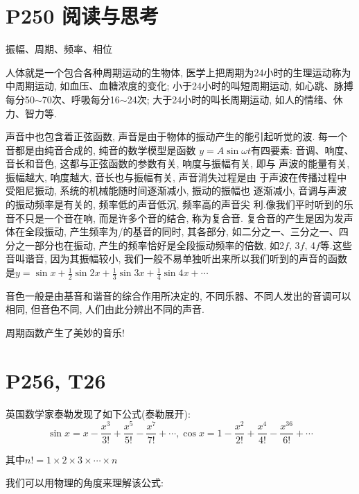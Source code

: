 \documentclass{book}
\begin{document}
    \section{\textcolor[rgb]{0.11,0.65,0.52}{P250 阅读与思考}}
    
    \begin{center}
        振幅、周期、频率、相位
    \end{center}

    人体就是一个包合各种周期运动的生物体, 医学上把周期为24小时的生理运动称为中周期运动, 如血压、血糖浓度的变化; 小于24小时的叫短周期运动,  如心跳、脉搏每分50$\sim$70次、呼吸每分16$\sim$24次; 大于24小时的叫长周期运动, 如人的情绪、休力、智力等. 
    
    声音中也包含着正弦函数, 声音是由于物体的振动产生的能引起听觉的波. 每一个音都是由纯音合成的, 纯音的数学模型是函数 $y=A\sin \omega t$有四要素:  音调、响度、音长和音色, 这都与正弦函数的参数有关, 响度与振幅有关, 即与 声波的能量有关, 振幅越大, 响度越大, 音长也与振幅有关, 声音消失过程是由 于声波在传播过程中受阻尼振动, 系统的机械能随时间逐渐减小, 振动的振幅也 逐渐减小, 音调与声波的振动频率是有关的, 频率低的声音低沉, 频率高的声音尖
    利.像我们平时听到的乐音不只是一个音在响, 而是许多个音的结合, 称为复合音.  复合音的产生是因为发声体在全段振动, 产生频率为/的基音的同时, 其各部分,  如二分之一、三分之一、四分之一部分也在振动, 产生的频率恰好是全段振动频率的倍数, 如2$f$, 3$f$, 4$f$等.这些音叫谐音, 因为其振幅较小, 我们一般不易单独听出来所以我们听到的声音的函数是$\displaystyle y=\sin x+\frac{1}{2}\sin 2x+\frac{1}{3}\sin 3x+\frac{1}{4}\sin 4x+\cdots$

    音色一般是由基音和谐音的综合作用所决定的, 不同乐器、不同人发出的音调可以相同, 但音色不同, 人们由此分辨出不同的声音.
    
    周期函数产生了美妙的音乐!

    \section{\textcolor[rgb]{0.11,0.65,0.52}{P256, T26}}
    英国数学家泰勒发现了如下公式\textcolor[rgb]{0.38,0.11,0.2}{(泰勒展开)}:
    $$
    \sin x = x - \frac{x^3}{3!}+\frac{x^5}{5!}-\frac{x^7}{7!}+\cdots,
    \cos x = 1-\frac{x^2}{2!}+\frac{x^4}{4!}-\frac{x^36}{6!}+\cdots
    $$

    其中$n!=1\times2\times3\times\cdots\times n$

    我们可以用\textcolor[rgb]{0.75,0.17,0.22}{物理的角度}来理解该公式:
\end{document}
